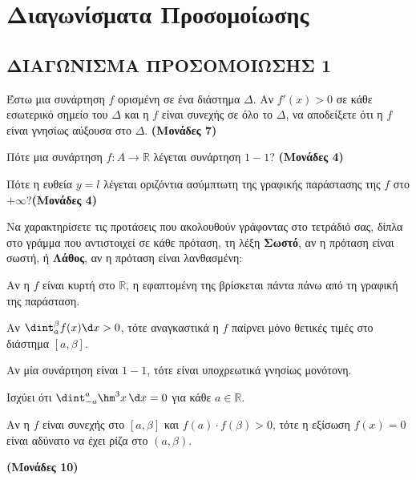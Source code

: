 \renewenvironment{thema}[1]
{\begin{tcolorbox}[title=\kerkissans{\textbf{\large{Θέμα  #1}}},breakable,
enhanced standard,titlerule=0pt,toprule=0pt, rightrule=0pt, bottomrule=0pt,
colback=white,left=0mm,top=1mm,bottom=0mm,
boxrule=0pt,
colframe=white,leftrule=0mm,sharp corners,coltitle=black]
\renewcommand{\themanum}{#1}}
{\end{tcolorbox}}
\newcommand{\monades}[1]{\hfill\textbf{(Μονάδες #1)}}
\section{Διαγωνίσματα Προσομοίωσης}
\subsection{ΔΙΑΓΩΝΙΣΜΑ ΠΡΟΣΟΜΟΙΩΣΗΣ 1}
\begin{thema}{Α}
\begin{erwthma}
    \item Έστω μια συνάρτηση $f$ ορισμένη σε ένα διάστημα $\Delta$. Αν $f'(x)>0$ σε κάθε εσωτερικό σημείο του $\Delta$ και η $f$ είναι συνεχής σε όλο το $\Delta$, να αποδείξετε ότι η $f$ είναι γνησίως αύξουσα στο $\Delta$. \monades{7}
    \item Πότε μια συνάρτηση $f:A\to\mathbb{R}$ λέγεται συνάρτηση $1-1$? \monades{4}
    \item Πότε η ευθεία $y = l$ λέγεται οριζόντια ασύμπτωτη της γραφικής παράστασης της $f$ στο $+\infty$?\monades{4}
    \item Να χαρακτηρίσετε τις προτάσεις που ακολουθούν γράφοντας στο τετράδιό σας, δίπλα στο γράμμα που αντιστοιχεί σε κάθε πρόταση, τη λέξη \textbf{Σωστό},
αν η πρόταση είναι σωστή, ή \textbf{Λάθος}, αν η πρόταση είναι λανθασμένη:
    \begin{alist}
        \item Αν η $f$ είναι κυρτή στο $\mathbb{R}$, η εφαπτομένη της βρίσκεται πάντα πάνω από τη γραφική της παράσταση.
        \item Αν $\dint_a^\beta f(x) \d x > 0$, τότε αναγκαστικά η $f$ παίρνει μόνο θετικές τιμές στο διάστημα $[a,\beta]$.
        \item Αν μία συνάρτηση είναι $1-1$, τότε είναι υποχρεωτικά γνησίως μονότονη.
        \item Ισχύει ότι $\dint_{-a}^a \hm^3x \,\d x = 0$ για κάθε $a \in \mathbb{R}$.
        \item Αν η $f$ είναι συνεχής στο $[a,\beta]$ και $f(a) \cdot f(\beta) > 0$, τότε η εξίσωση $f(x)=0$ είναι αδύνατο να έχει ρίζα στο $(a,\beta)$.
    \end{alist} \monades{10}
\end{erwthma}
\end{thema}
